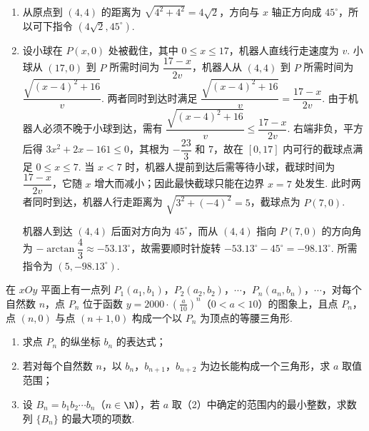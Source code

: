 \begin{solution}
\begin{enumerate}
\item 从原点到 \((4,4)\) 的距离为 \(\sqrt{4^2+4^2}=4\sqrt{2}\)，方向与 \(x\) 轴正方向成 \(45^\circ\)，所以可下指令 \(\left(4\sqrt{2},45^\circ\right)\).
\item 设小球在 \(P(x,0)\) 处被截住，其中 \(0\leqslant x\leqslant17\)，机器人直线行走速度为 \(v\). 小球从 \((17,0)\) 到 \(P\) 所需时间为 \(\dfrac{17-x}{2v}\)，机器人从 \((4,4)\) 到 \(P\) 所需时间为 \(\dfrac{\sqrt{(x-4)^2+16}}{v}\). 两者同时到达时满足
\(\dfrac{\sqrt{(x-4)^2+16}}{v}=\dfrac{17-x}{2v}\).
由于机器人必须不晚于小球到达，需有 \(\dfrac{\sqrt{(x-4)^2+16}}{v}\leqslant\dfrac{17-x}{2v}\). 右端非负，平方后得 \(3x^2+2x-161\leqslant0\)，其根为 \(-\dfrac{23}{3}\) 和 \(7\)，故在 \([0,17]\) 内可行的截球点满足 \(0\leqslant x\leqslant7\). 当 \(x<7\) 时，机器人提前到达后需等待小球，截球时间为 \(\dfrac{17-x}{2v}\)，它随 \(x\) 增大而减小；因此最快截球只能在边界 \(x=7\) 处发生. 此时两者同时到达，机器人行走距离为 \(\sqrt{3^2+(-4)^2}=5\)，截球点为 \(P(7,0)\).

机器人到达 \((4,4)\) 后面对方向为 \(45^\circ\)，而从 \((4,4)\) 指向 \(P(7,0)\) 的方向角为 \(-\arctan\dfrac{4}{3}\approx-53.13^\circ\)，故需要顺时针旋转 \(-53.13^\circ-45^\circ=-98.13^\circ\). 所需指令为 \(\left(5,-98.13^\circ\right)\).
\end{enumerate}
\end{solution}

\begin{problem}
在 \(xOy\) 平面上有一点列 \(P_{1}(a_{1},b_{1})\)，\(P_{2}(a_{2},b_{2})\)，\(\cdots\)，\(P_{n}(a_{n},b_{n})\)，\(\cdots\)，对每个自然数 \(n\)，点 \(P_{n}\) 位于函数 \(y = 2000 \cdot \left(\frac{a}{10}\right)^{n}\)（\(0 < a < 10\)）的图象上，且点 \(P_{n}\)，点 \((n,0)\) 与点 \((n + 1,0)\) 构成一个以 \(P_{n}\) 为顶点的等腰三角形.
\begin{enumerate}
\item 求点 \(P_{n}\) 的纵坐标 \(b_{n}\) 的表达式；
\item 若对每个自然数 \(n\)，以 \(b_{n}\)，\(b_{n+1}\)，\(b_{n+2}\) 为边长能构成一个三角形，求 \(a\) 取值范围；
\item 设 \(B_{n} = b_{1}b_{2}\cdots b_{n}\)（\(n \in \N\)），若 \(a\) 取（2）中确定的范围内的最小整数，求数列 \(\{B_{n}\}\) 的最大项的项数.
\end{enumerate}
\end{problem}

